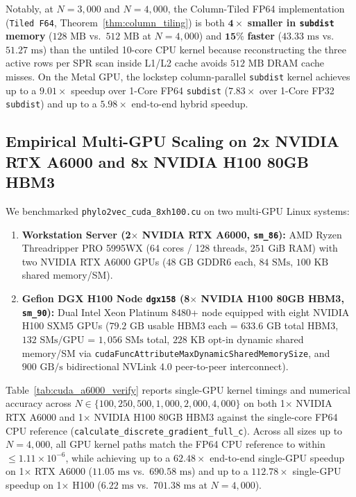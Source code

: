 \documentclass[11pt,a4paper]{article}
\theoremstyle{definition}
\begin{document}
Notably, at $N = 3{,}000$ and $N = 4{,}000$, the Column-Tiled FP64 implementation (\texttt{Tiled F64}, Theorem~\ref{thm:column_tiling}) is both $\mathbf{4\times}$ \textbf{smaller in \texttt{subdist} memory} ($128\text{ MB}$ vs.\ $512\text{ MB}$ at $N=4{,}000$) and $\mathbf{15\%}$ \textbf{faster} ($43.33\text{ ms}$ vs.\ $51.27\text{ ms}$) than the untiled 10-core CPU kernel because reconstructing the three active rows per SPR scan inside L1/L2 cache avoids $512\text{ MB}$ DRAM cache misses. On the Metal GPU, the lockstep column-parallel \texttt{subdist} kernel achieves up to a $\mathbf{9.01\times}$ speedup over 1-Core FP64 \texttt{subdist} ($\mathbf{7.83\times}$ over 1-Core FP32 \texttt{subdist}) and up to a $\mathbf{5.98\times}$ end-to-end hybrid speedup.

\subsection{Empirical Multi-GPU Scaling on 2x NVIDIA RTX A6000 and 8x NVIDIA H100 80GB HBM3}
We benchmarked \texttt{phylo2vec\_cuda\_8xh100.cu} on two multi-GPU Linux systems:
\begin{enumerate}
    \item \textbf{Workstation Server (2$\times$ NVIDIA RTX A6000, \texttt{sm\_86}):} AMD Ryzen Threadripper PRO 5995WX (64 cores / 128 threads, $251\text{ GiB}$ RAM) with two NVIDIA RTX A6000 GPUs ($48\text{ GB}$ GDDR6 each, $84\text{ SMs}$, $100\text{ KB}$ shared memory/SM).
    \item \textbf{Gefion DGX H100 Node \texttt{dgx158} (8$\times$ NVIDIA H100 80GB HBM3, \texttt{sm\_90}):} Dual Intel Xeon Platinum 8480+ node equipped with eight NVIDIA H100 SXM5 GPUs ($79.2\text{ GB}$ usable HBM3 each = $633.6\text{ GB}$ total HBM3, $132\text{ SMs/GPU}$ = $1{,}056\text{ SMs}$ total, $228\text{ KB}$ opt-in dynamic shared memory/SM via \texttt{cudaFuncAttributeMaxDynamicSharedMemorySize}, and $900\text{ GB/s}$ bidirectional NVLink 4.0 peer-to-peer interconnect).
\end{enumerate}

Table~\ref{tab:cuda_a6000_verify} reports single-GPU kernel timings and numerical accuracy across $N \in \{100, 250, 500, 1{,}000, 2{,}000, 4{,}000\}$ on both 1$\times$ NVIDIA RTX A6000 and 1$\times$ NVIDIA H100 80GB HBM3 against the single-core FP64 CPU reference (\texttt{calculate\_discrete\_gradient\_full\_c}). Across all sizes up to $N = 4{,}000$, all GPU kernel paths match the FP64 CPU reference to within $\le 1.11 \times 10^{-6}$, while achieving up to a $\mathbf{62.48\times}$ end-to-end single-GPU speedup on 1$\times$ RTX A6000 ($11.05\text{ ms}$ vs.\ $690.58\text{ ms}$) and up to a $\mathbf{112.78\times}$ single-GPU speedup on 1$\times$ H100 ($6.22\text{ ms}$ vs.\ $701.38\text{ ms}$ at $N = 4{,}000$).
\end{document}
